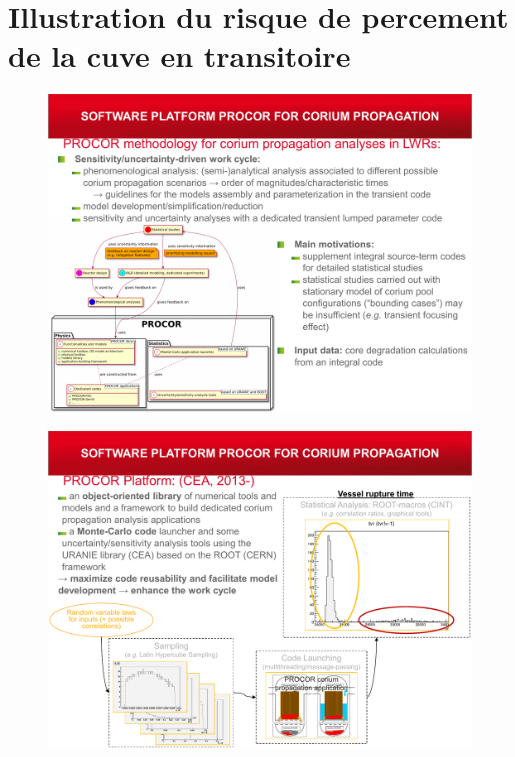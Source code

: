 \section{Illustration du risque de percement de la cuve en transitoire}
\begin{frame}[fragile]
\baselineskip
\begin{figure}[H]
\centering \includegraphics[height=\textheight]{Figures/procor_0a.pdf} 
\end{figure}
\end{frame}
\begin{frame}[fragile]
\baselineskip
\begin{figure}[H]
\centering \includegraphics[height=\textheight]{Figures/procor_0b.pdf} 
\end{figure}
\end{frame}
